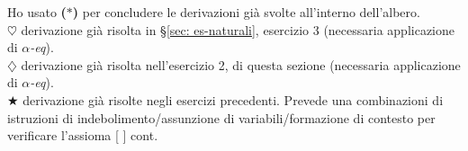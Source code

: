 \begin{enumerate}
\begin{adjustwidth}{-10em}{}
\begin{prooftree}
\end{prooftree}
\end{adjustwidth}
\vspace{0.5cm}
\normalsize
\noindent Ho usato \textbf{($\ast$)} per concludere le derivazioni gi\`a svolte all'interno dell'albero.\\
\textbf{$\heartsuit$} derivazione gi\`a risolta in \S\ref{sec: es-naturali}, esercizio 3 (necessaria applicazione di \textit{$\alpha$-eq}).\\
\textbf{$\diamondsuit$} derivazione gi\`a risolta nell'esercizio 2, di questa sezione (necessaria applicazione di \textit{$\alpha$-eq}).\\
\textbf{$\bigstar$} derivazione gi\`a risolte negli esercizi precedenti. Prevede una combinazioni di istruzioni di indebolimento/assunzione di variabili/formazione di contesto per verificare l'assioma [ ] cont.\\
\end{enumerate}

